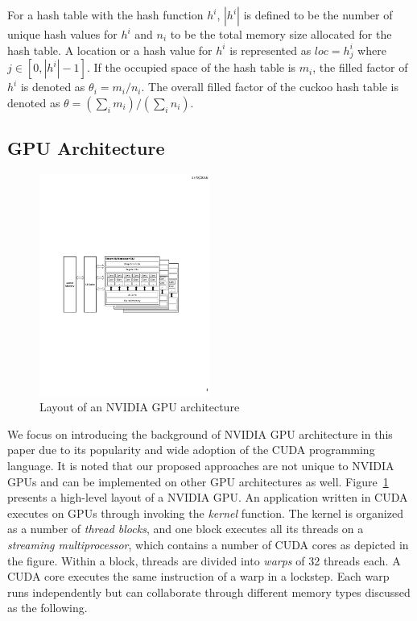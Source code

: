 For a hash table with the hash function $h^i$, $|h^i|$ is defined to be the number of unique hash values for $h^i$ and $n_i$ to be the total memory size allocated for the hash table.
A location or a hash value for $h^i$ is represented as $loc = h^i_j$ where $j \in [0,|h^i|-1]$.
If the occupied space of the hash table is $m_i$, the filled factor of $h^i$ is denoted as $\theta_i = m_i / n_i$. The overall filled factor of the cuckoo hash table is denoted as $\theta = (\sum_i m_i) / (\sum_i n_i)$.

\subsection{GPU Architecture}

\begin{figure}[t]
	\centering
	\includegraphics[width=0.5\textwidth]{fig/GPU-arch.pdf}
	\caption{Layout of an NVIDIA GPU architecture}
	\label{fig:arch}
\end{figure}

We focus on introducing the background of NVIDIA GPU architecture in this paper due to its popularity and wide adoption of the CUDA programming language. 
It is noted that our proposed approaches are not unique to NVIDIA GPUs and can be implemented on other GPU architectures as well. Figure~\ref{fig:arch} presents a high-level layout of a NVIDIA GPU. An application written in CUDA executes on GPUs through invoking the \emph{kernel} function. The kernel is organized as a number of \emph{thread blocks}, and one block executes all its threads on a \emph{streaming multiprocessor}, which contains a number of CUDA cores as depicted in the figure. Within a block, threads are divided into \emph{warps} of 32 threads each. 
A CUDA core executes the same instruction of a warp in a lockstep.
Each warp runs independently but can collaborate through different memory types discussed as the following.  

